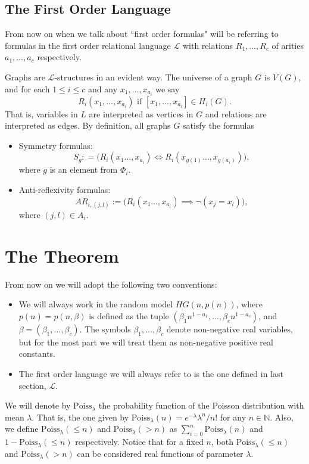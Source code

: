\documentclass[11pt,notitlepage,a4paper]{article}
\theoremstyle{definition}
\newcommand{\N}{\mathbb{N}}
\begin{document}
\subsection{The First Order Language}

From now on when we talk about ``first order formulas" 
will be referring to formulas in the first order relational 
language $\mathcal{L}$ with relations $R_1,..., R_c$ of arities
$a_1,\dots, a_c$ respectively. \par

Graphs are $\mathcal{L}$-structures in an evident way. 
The universe of a graph $G$ is $V(G)$, and for each 
$1\leq i \leq c$ and any $x_1,\dots, x_{a_i}$ we say 
\[R_i(x_1,\dots,x_{a_i}) \text{ if } [x_1,\dots, x_{a_i}]\in H_i(G).\] 
That is, variables in $L$ are interpreted as vertices in $G$ and
relations are interpreted as edges. By definition, all graphs $G$ 
satisfy the formulas
\begin{itemize}
	\item Symmetry formulas:
	\[ S_g: =\big( R_i(x_1\dots,x_{a_i})\iff R_i(x_{g(1)}\dots,x_{g(a_i)})\big) ,\]
	where $g$ is an element from $\Phi_i$.
	\item Anti-reflexivity formulas:
	\[AR_{i,(j,l)}:=\big(R_i(x_1\dots,x_{a_i})\implies 
	\neg(x_j= x_l)\big),\]
	where $(j,l)\in A_i$.
\end{itemize}
 
\section{The Theorem}

From now on we will adopt the following two conventions:
\begin{itemize}
	\item We will always work in the random model $HG(n,p(n))$, where
	$p(n)=p(n,\beta)$ is defined as the tuple
	$(\beta_1 n^{1-a_1},\dots, \beta_c n^{1-a_c})$, and
	$\beta=(\beta_1,\dots, \beta_c)$.
	The symbols $\beta_1,\dots, \beta_c$
	denote non-negative real variables,
	but for the most part we will 
	treat them as non-negative positive real constants.
	\item The first order language we will always refer to is the one 
	defined in last section, $\mathcal{L}$. 
\end{itemize}
 
We will denote by $\mathrm{Poiss}_\lambda$ the probability
function of the Poisson distribution with mean $\lambda$.
That is, the one given by $\mathrm{Poiss}_\lambda(n)=e^{-\lambda}\lambda^n/n!$ 
for any $n\in \N$.
Also, we define $\mathrm{Poiss}_\lambda(\leq n)$ and $\mathrm{Poiss}_\lambda(>n)$ as 
$\sum_{i=0}^n \mathrm{Poiss}_\lambda(n)$ and $1-\mathrm{Poiss}_\lambda(\leq n)$
respectively. Notice that for a fixed $n$, both $\mathrm{Poiss}_\lambda(\leq n)$ 
and $\mathrm{Poiss}_\lambda(>n)$ can be considered real functions of parameter $\lambda$. \par
\end{document}
